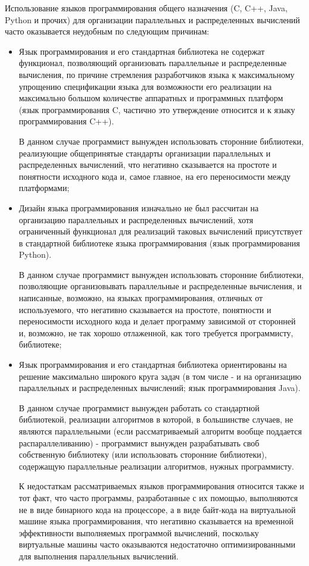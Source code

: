 

Использование языков программирования общего назначения (C, C++, Java, Python и прочих) для организации параллельных и распределенных вычислений часто оказывается неудобным по следующим причинам:

\begin{itemize}

	\item Язык программирования и его стандартная библиотека не содержат функционал, позволяющий организовать параллельные и распределенные вычисления, по причине стремления разработчиков языка к максимальному упрощению спецификации языка для возможности его реализации на максимально большом количестве аппаратных и программных платформ (язык программирования C, частично это утверждение относится и к языку программирования C++).

	В данном случае программист вынужден использовать сторонние библиотеки, реализующие общепринятые стандарты организации параллельных и распределенных вычислений, что негативно сказывается на простоте и понятности исходного кода и, самое главное, на его переносимости между платформами;

	\item Дизайн языка программирования изначально не был рассчитан на организацию параллельных и распределенных вычислений, хотя ограниченный функционал для реализаций таковых вычислений присутствует в стандартной библиотеке языка программирования (язык программирования Python).

	В данном случае программист вынужден использовать сторонние библиотеки, позволяющие организовывать параллельные и распределенные вычисления, и написанные, возможно, на языках программирования, отличных от используемого, что негативно сказывается на простоте, понятности и переносимости исходного кода и делает программу зависимой от сторонней и, возможно, не так хорошо отлаженной, как того требуется программисту, библиотеке;

	\item Язык программирования и его стандартная библиотека ориентированы на решение максимально широкого круга задач (в том числе - и на организацию параллельных и распределенных вычислений; язык программирования Java).

	В данном случае программист вынужден работать со стандартной библиотекой, реализации алгоритмов в которой, в большинстве случаев, не являются параллельными (если рассматриваемый алгоритм вообще поддается распараллеливанию) - программист вынужден разрабатывать своб собственную библиотеку (или использовать сторонние библиотеки), содержащую параллельные реализации алгоритмов, нужных программисту.

	К недостаткам рассматриваемых языков программирования относится также и тот факт, что часто программы, разработанные с их помощью, выполняются не в виде бинарного кода на процессоре, а в виде байт-кода на виртуальной машине языка программирования, что негативно сказывается на временной эффективности выполняемых программой вычислений, поскольку виртуальные машины часто оказываются недостаточно оптимизированными для выполнения параллельных вычислений.

\end{itemize}

